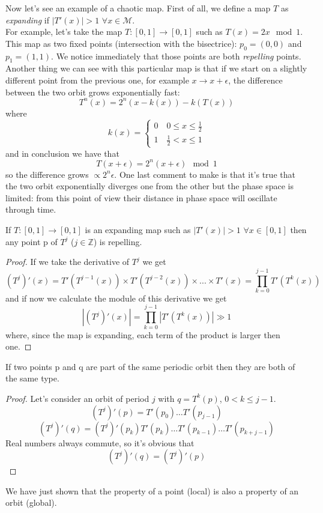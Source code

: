 Now let's see an example of a chaotic map.
First of all, we define a map $T$ as \emph{expanding} if $\left\lvert T'\left(x\right)\right\rvert > 1$ $\forall x \in \mathcal{M}$. \\
For example, let's take the map $T : \left[0,1\right] \to \left[0,1\right]$ such as $T\left(x\right)=2x \mod{1}$.
This map as two fixed points (intersection with the bisectrice): $p_0 = \left(0,0\right)$ and $p_1 = \left(1,1\right)$.
We notice immediately that those points are both \emph{repelling} points.
Another thing we can see with this particular map is that if we start on a slightly different point from the previous one, for example $x \to x + \epsilon$, the difference between the two orbit grows exponentially fast:
$$
    T^n\left(x\right)=2^n\left(x-k\left(x\right)\right)-k\left(T\left(x\right)\right)
$$
where
$$
    k\left(x\right)=
    \begin{cases}
        0 \quad 0\leq x \leq \frac{1}{2} \\
        1 \quad \frac{1}{2} < x \leq 1
    \end{cases}
$$
and in conclusion we have that
$$
    T\left(x + \epsilon\right)=2^n\left(x + \epsilon\right)\mod{1}
$$
so the difference grows $\propto 2^n\epsilon$.
One last comment to make is that it's true that the two orbit exponentially diverges one from the other but the phase space is limited: from this point of view their distance in phase space will oscillate through time.


\begin{prop}
    If $T : \left[0,1\right] \to \left[0,1\right]$ is an expanding map such as $\left\lvert T'\left(x\right)\right\rvert > 1$ $\forall x \in \left[0,1\right]$ then any point p of $T^j$ ($j \in \mathbb{Z}$) is repelling.
\end{prop}
\begin{proof}
	If we take the derivative of $T^j$ we get
	$$
		(T^j)'(x) = T'(T^{j-1}(x))\times T'(T^{j-2}(x))\times...\times T'(x) = \prod_{k=0}^{j-1}T'\left(T^k\left(x\right)\right)
   $$
  	and if now we calculate the module of this derivative we get 
   $$
       \left\lvert\left(T^j\right)'\left(x\right)\right\rvert = \prod_{k=0}^{j-1}\left\lvert T'\left(T^k\left(x\right)\right)\right\rvert \gg 1
   $$
	where, since the map is expanding, each term of the product is larger then one.
\end{proof}
\begin{prop}
    If two points p and q are part of the same periodic orbit then they are both of the same type.
\end{prop}
\begin{proof}
    Let's consider an orbit of period $j$ with $q=T^k\left(p\right)$, $0 < k \leq j-1$.
    $$
        \left(T^j\right)'\left(p\right) = T'\left(p_0\right)\ldots T'\left(p_{j-1}\right)
    $$
    $$
        \left(T^j\right)'\left(q\right) = \left(T^j\right)'\left(p_k\right) T'\left(p_k\right)\ldots T'\left(p_{k-1}\right) \ldots T'\left(p_{k+j-1}\right)
    $$
    Real numbers always commute, so it's obvious that
    $$
        \left(T^j\right)'\left(q\right) = \left(T^j\right)'\left(p\right)
    $$
\end{proof}
We have just shown that the property of a point (local) is also a property of an orbit (global).
